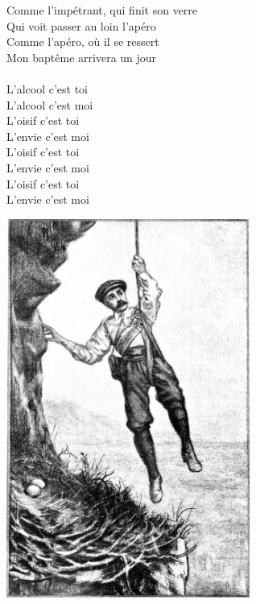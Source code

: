 Comme l'impétrant, qui finit son verre
\\Qui voit passer au loin l'apéro
\\Comme l'apéro, où il se ressert
\\Mon baptême arrivera un jour
\\\\L'alcool c'est toi
\\L'alcool c'est moi
\\L'oisif c'est toi
\\L'envie c'est moi
\\L'oisif c'est toi
\\L'envie c'est moi
\\L'oisif c'est toi
\\L'envie c'est moi

\vspace{1cm}
\begin{center}
\includegraphics[width=0.6\textwidth]{images/brev23.png}
\end{center}

\breakpage